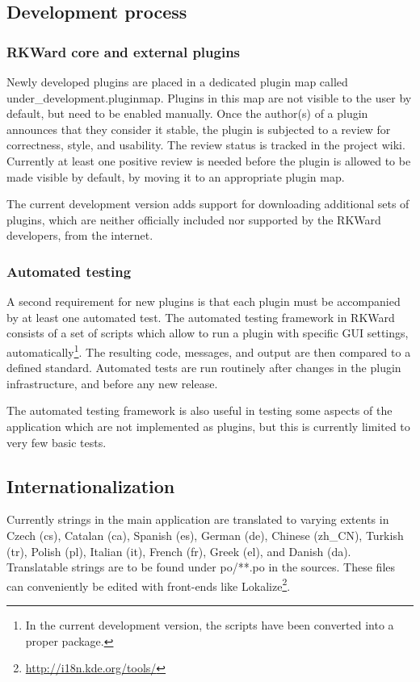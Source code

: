 \subsection{Development process}
\subsubsection{RKWard core and external plugins}
\label{sec:technical_processes_plugins}
Newly developed plugins are placed in a dedicated plugin map called
under\_development.pluginmap. Plugins in this map are not visible to the user by
default, but need to be enabled manually. Once the author(s) of a plugin
announces that they consider it stable, the plugin is subjected to a review for
correctness, style, and usability. The review status is tracked in the project
wiki. Currently at least one positive review is needed before the plugin is
allowed to be made visible by default, by moving it to an appropriate plugin
map.

The current development version adds support for downloading additional sets of
plugins, which are neither officially included nor supported by the
RKWard developers, from the internet.

\subsubsection{Automated testing}
\label{sec:technical_processes_automatedtesting}
A second requirement for new plugins is that each plugin must be accompanied by
at least one automated test. The automated testing framework in RKWard consists
of a set of  scripts which allow to run a plugin with specific GUI settings,
automatically\footnote{
  In the current development version, the scripts have been converted into a proper
   package.
}. The resulting  code,  messages, and output are then compared
to a defined standard. Automated tests are run routinely after changes in the
plugin infrastructure, and before any new release.

The automated testing framework is also useful in testing some aspects of the
application which are not implemented as plugins, but this is currently limited
to very few basic tests.

\subsection{Internationalization}
\label{sec:technical_internationalization}
Currently strings in the main application are translated to varying extents in
Czech (cs), Catalan (ca), Spanish (es), German (de), Chinese (zh\_CN), Turkish
(tr), Polish (pl), Italian (it), French (fr), Greek (el), and Danish (da).
Translatable strings are to be found under po/**.po in the sources. These files
can conveniently be edited with front-ends like Lokalize\footnote{\url{http://i18n.kde.org/tools/}}. 

